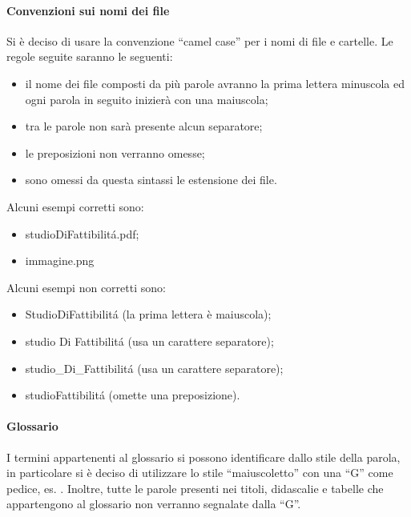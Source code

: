 			\paragraph{Convenzioni sui nomi dei file}
				Si è deciso di usare la convenzione ``camel case'' per i nomi di file e cartelle. Le regole seguite saranno le seguenti:
				\begin{itemize}
					\item il nome dei file composti da più parole avranno la prima lettera minuscola ed ogni parola in seguito inizierà con una maiuscola;
					\item tra le parole non sarà presente alcun separatore;
					\item le preposizioni non verranno omesse;
					\item sono omessi da questa sintassi le estensione dei file.
				\end{itemize}
				Alcuni esempi corretti sono:
				\begin{itemize}
					\item studioDiFattibilitá.pdf;
					\item immagine.png
				\end{itemize}
				Alcuni esempi non corretti sono:
				\begin{itemize}
					\item StudioDiFattibilitá (la prima lettera è maiuscola);
					\item studio Di Fattibilitá (usa un carattere separatore);
					\item studio\_Di\_Fattibilitá (usa un carattere separatore);
					\item studioFattibilitá (omette una preposizione).
				\end{itemize}
			\paragraph{Glossario}
				I termini appartenenti al glossario si possono identificare dallo stile della parola, in particolare si è deciso di utilizzare lo stile ``maiuscoletto'' con una ``G'' come pedice, es. . Inoltre, tutte le parole presenti nei titoli, didascalie e tabelle che appartengono al glossario non verranno segnalate dalla ``G''.
